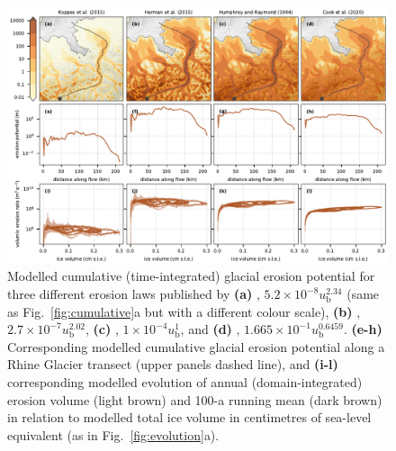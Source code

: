 \documentclass[esurf, manuscript]{copernicus}
\begin{document}
    \begin{figure}[ht]
      \centerline{\includegraphics{alpero_powerlaws}}
      \caption{%
        Modelled cumulative (time-integrated) glacial erosion potential for
        three different erosion laws published by
        \textbf{(a)} \citet{Koppes.etal.2015},
          ${5.2 \times 10^{-8} u_\mathrm{b}^{2.34}}$ (same as
          Fig.~\ref{fig:cumulative}a but with a different colour scale),
        \textbf{(b)} \citet{Herman.etal.2015},
          ${2.7 \times 10^{-7} u_\mathrm{b}^{2.02}}$,
        \textbf{(c)} \citet{Humphrey.Raymond.1994},
          ${1 \times 10^{-4} u_\mathrm{b}^{1}}$, and
        \textbf{(d)} \citet{Cook.etal.2020},
          ${1.665 \times 10^{-1} u_\mathrm{b}^{0.6459}}$.
        \textbf{(e-h)} Corresponding modelled cumulative glacial erosion
          potential along a Rhine Glacier transect (upper panels dashed line), and
        \textbf{(i-l)} corresponding modelled evolution of annual
        (domain-integrated) erosion volume (light brown) and 100-a
        running mean (dark brown) in relation to modelled total ice volume in
        centimetres of sea-level equivalent (as in Fig.~\ref{fig:evolution}a).}
      \label{fig:powerlaws}
    \end{figure}
\end{document}
